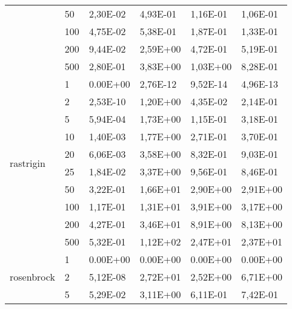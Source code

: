 \begin{longtable}[c]{|p{3.5cm}|l|l|l|l|l|}
                                        & 50        & 2,30E-02   & 4,93E-01   & 1,16E-01   & 1,06E-01  \\ \cline{2-6} 
                                        & 100       & 4,75E-02   & 5,38E-01   & 1,87E-01   & 1,33E-01  \\ \cline{2-6} 
                                        & 200       & 9,44E-02   & 2,59E+00   & 4,72E-01   & 5,19E-01  \\ \cline{2-6} 
                                        & 500       & 2,80E-01   & 3,83E+00   & 1,03E+00   & 8,28E-01  \\ \hline
\multirow[t]{10}{*}{rastrigin}             & 1         & 0.00E+00   & 2,76E-12   & 9,52E-14   & 4,96E-13  \\ \cline{2-6} 
                                        & 2         & 2,53E-10   & 1,20E+00   & 4,35E-02   & 2,14E-01  \\ \cline{2-6} 
                                        & 5         & 5,94E-04   & 1,73E+00   & 1,15E-01   & 3,18E-01  \\ \cline{2-6} 
                                        & 10        & 1,40E-03   & 1,77E+00   & 2,71E-01   & 3,70E-01  \\ \cline{2-6} 
                                        & 20        & 6,06E-03   & 3,58E+00   & 8,32E-01   & 9,03E-01  \\ \cline{2-6} 
                                        & 25        & 1,84E-02   & 3,37E+00   & 9,56E-01   & 8,46E-01  \\ \cline{2-6} 
                                        & 50        & 3,22E-01   & 1,66E+01   & 2,90E+00   & 2,91E+00  \\ \cline{2-6} 
                                        & 100       & 1,17E-01   & 1,31E+01   & 3,91E+00   & 3,17E+00  \\ \cline{2-6} 
                                        & 200       & 4,27E-01   & 3,46E+01   & 8,91E+00   & 8,13E+00  \\ \cline{2-6} 
                                        & 500       & 5,32E-01   & 1,12E+02   & 2,47E+01   & 2,37E+01  \\ \hline
\multirow[t]{10}{*}{rosenbrock}            & 1         & 0.00E+00   & 0.00E+00   & 0.00E+00   & 0.00E+00  \\ \cline{2-6} 
                                        & 2         & 5,12E-08   & 2,72E+01   & 2,52E+00   & 6,71E+00  \\ \cline{2-6} 
                                        & 5         & 5,29E-02   & 3,11E+00   & 6,11E-01   & 7,42E-01  \\ \cline{2-6} 

\end{longtable}
